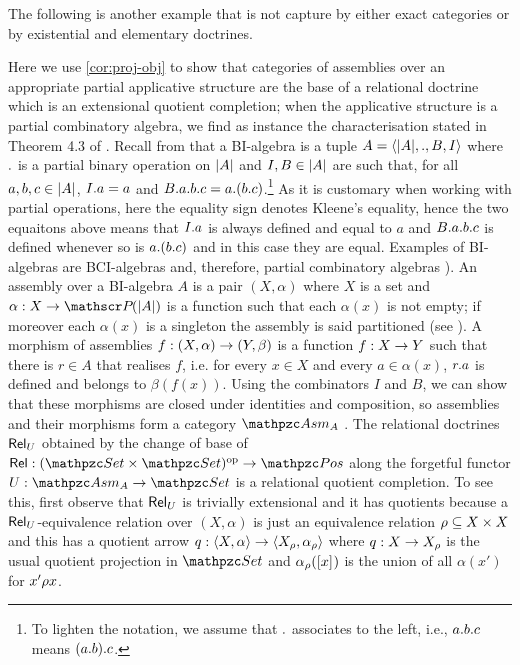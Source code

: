 The following is another example that is not capture by either exact  categories or by existential and elementary doctrines.
\begin{example}
Here we use \cref{cor:proj-obj} to show that categories of assemblies over an appropriate partial applicative structure are the base of a relational doctrine which is an extensional quotient completion; when  the applicative structure is a partial combinatory algebra, we find as instance the characterisation stated in Theorem 4.3 of \cite{lmcs:4302}. 
 Recall from \cite{tomita:LIPIcs.CSL.2021.38} that a BI-algebra is a tuple $A={\langle |A|,., B,I \rangle }$ where 
$.$ is a partial binary operation on $|A|$ and $I,B\in |A|$ are such that, for all $a,b,c\in|A|$, 
$I. a = a$ and $B. a . b . c = a. (b. c)$.\footnote{To lighten the notation, we assume that $.$ associates to the left, i.e., $a. b . c$ means $(a. b). c$. } 
As it is customary when working with partial operations, 
here the equality sign denotes Kleene's equality, hence the two equaitons above means that
$I. a$ is always defined and equal to $a$ and 
$B. a . b . c$ is defined whenever so is $a. (b. c)$ and in this case they are equal. 
Examples of BI-algebras are BCI-algebras \cite{AbramskyHS02} and, therefore, partial combinatory algebras \cite{OostenJ:reaait}). 
% 
An assembly over a BI-algebra $A$ is a pair $(X,\alpha)$ where $X$ is a set and $\fun{\alpha}{X}{\pw {\Car{A}}}$ is a function such that each $\alpha(x)$ is not empty; 
if moreover each $\alpha(x)$ is a singleton the assembly is said partitioned (see
\cite{CarboniA:somfcr}). 
A morphism of assemblies $\fun{f}{(X,\alpha)}{(Y, \beta)}$ is a function $\fun{f}{X}{Y}$ such that there is $r\in A$ that realises $f$, 
i.e. for every $x\in X$ and every $a\in \alpha(x)$, $r. a$ is defined and belongs to $\beta(f(x))$.
Using the combinators $I$ and $B$, we can show that these morphisms are closed under identities and composition, so  assemblies and  their morphisms form a category $\ct{Asm}_{A}$  \cite{tomita:LIPIcs.CSL.2021.38}. 
The relational doctrines $\mathsf{Rel}_U$ obtained by the change of base of $\fun{\Rel}{\bop{\ct{Set}}}{\Pos}$ along the forgetful functor $\fun{U}{\ct{Asm}_{A}}{\ct{Set}}$ is a relational quotient completion. 
To see this, first observe that $\mathsf{Rel}_U$ is trivially extensional and it has quotients because 
a $\mathsf{Rel}_U$-equivalence relation  over $(X,\alpha)$ is just an equivalence relation $\rho\subseteq X\times X$ and this  has a quotient arrow $\fun{q}{\ple{X,\alpha}}{\ple{X_\eqrelr,\alpha_\eqrelr}}$ where $\fun{q}{X}{X_\eqrelr}$ is the usual quotient projection in $\Set$ and $\alpha_\rho([x]_{})$  is the union of all $\alpha(x')$ for $x'\rho x$. 

\end{example}
